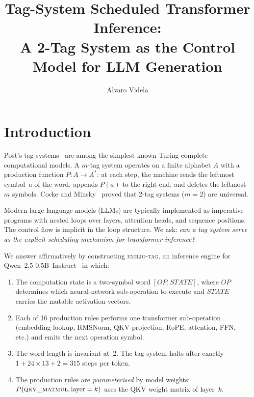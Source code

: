 \documentclass[acmsmall,nonacm]{acmart}
\title{Tag-System Scheduled Transformer Inference:\\
  A 2-Tag System as the Control Model for LLM Generation}
\author{Alvaro Videla}
\affiliation{%
  \institution{Independent Researcher}
  \city{N/A}
  \country{N/A}
}
\begin{document}
\maketitle

\section{Introduction}
\label{sec:intro}

Post's tag systems~\cite{post1943} are among the simplest known
Turing-complete computational models.  A $m$-tag system operates on a
finite alphabet $A$ with a production function $P : A \to A^*$: at
each step, the machine reads the leftmost symbol~$a$ of the word,
appends $P(a)$ to the right end, and deletes the leftmost~$m$
symbols.  Cocke and Minsky~\cite{cocke1964} proved that 2-tag systems
($m=2$) are universal.

Modern large language models (LLMs) are typically implemented as
imperative programs with nested loops over layers, attention heads,
and sequence positions.  The control flow is implicit in the loop
structure.  We ask: \emph{can a tag system serve as the explicit
scheduling mechanism for transformer inference?}

We answer affirmatively by constructing \textsc{emilio-tag}, an
inference engine for Qwen~2.5 0.5B~Instruct~\cite{qwen2025} in
which:

\begin{enumerate}
\item The computation state is a two-symbol word
  $[\mathit{OP}, \mathit{STATE}]$, where $\mathit{OP}$ determines
  which neural-network sub-operation to execute and $\mathit{STATE}$
  carries the mutable activation vectors.

\item Each of 16 production rules performs one transformer
  sub-operation (embedding lookup, RMSNorm, QKV projection,
  RoPE, attention, FFN, etc.) and emits the next operation symbol.

\item The word length is invariant at~2.  The tag system halts
  after exactly $1 + 24 \times 13 + 2 = 315$ steps per token.

\item The production rules are \emph{parameterised} by model
  weights: $P(\textsc{qkv\_matmul}, \text{layer}=k)$ uses the
  QKV weight matrix of layer~$k$.
\end{enumerate}
\end{document}
